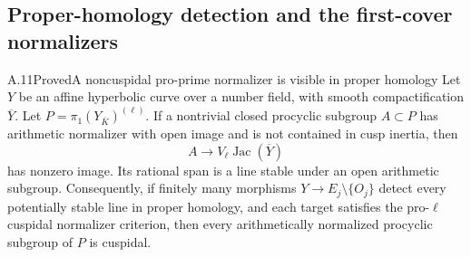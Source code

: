 \subsection{Proper-homology detection and the first-cover normalizers}

\begin{statement}{A.11}{Proved}{A noncuspidal pro-prime normalizer is visible in proper homology}
Let $Y$ be an affine hyperbolic curve over a number field, with smooth
compactification $\overline Y$. Let $P=\pi_1(Y_{\overline K})^{(\ell)}$.
If a nontrivial closed procyclic subgroup $A\subset P$ has arithmetic
normalizer with open image and is not contained in cusp inertia, then
\[
                  A\longrightarrow V_\ell\operatorname{Jac}(\overline Y)
\]
has nonzero image. Its rational span is a line stable under an open
arithmetic subgroup. Consequently, if finitely many morphisms
$Y\to E_j\setminus\{O_j\}$ detect every potentially stable line in
proper homology, and each target satisfies the pro-$\ell$ cuspidal
normalizer criterion, then every arithmetically normalized procyclic
subgroup of $P$ is cuspidal.
\end{statement}

